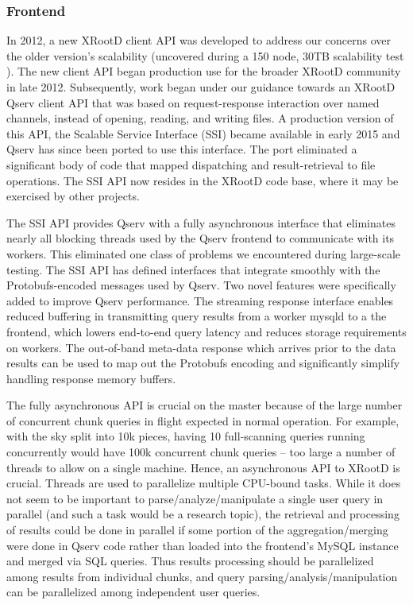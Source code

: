 \documentclass[DM,lsstdraft,toc]{lsstdoc}
\begin{document}
\subsubsection{Frontend}\label{frontend}

In 2012, a new XRootD client API was developed to address our concerns over
the older version's scalability (uncovered during a 150 node, 30TB scalability
test ). The new client API began production use for the
broader XRootD community in late 2012. Subsequently, work began under our
guidance towards an XRootD Qserv client API that was based on request-response
interaction over named channels, instead of opening, reading, and writing
files. A production version of this API, the Scalable Service Interface (SSI)
became available in early 2015 and Qserv has since been ported to use this
interface. The port eliminated a significant body of code that mapped
dispatching and result-retrieval to file operations. The SSI API now resides
in the XRootD code base, where it may be exercised by other projects.

The SSI API provides Qserv with a fully asynchronous interface that eliminates
nearly all blocking threads used by the Qserv frontend to communicate with its
workers. This eliminated one class of problems we encountered during large-scale
testing. The SSI API has defined interfaces that integrate smoothly with
the Protobufs-encoded messages used by Qserv. Two novel features were
specifically added to improve Qserv performance. The streaming response
interface enables reduced buffering in transmitting query results from a
worker mysqld to a the frontend, which lowers end-to-end query latency and
reduces storage requirements on workers. The out-of-band meta-data response
which arrives prior to the data results can be used to map out the Protobufs
encoding and significantly simplify handling response memory buffers.

The fully asynchronous API is crucial on the master because of the large
number of concurrent chunk queries in flight expected in normal operation. For
example, with the sky split into 10k pieces, having 10 full-scanning queries
running concurrently would have 100k concurrent chunk queries -- too large a
number of threads to allow on a single machine. Hence, an asynchronous API to
XRootD is crucial. Threads are used to parallelize multiple CPU-bound tasks.
While it does not seem to be important to parse/analyze/manipulate a single
user query in parallel (and such a task would be a research topic), the
retrieval and processing of results could be done in parallel if some portion
of the aggregation/merging were done in Qserv code rather than loaded into the
frontend's MySQL instance and merged via SQL queries. Thus results processing
should be parallelized among results from individual chunks, and query
parsing/analysis/manipulation can be parallelized among independent user
queries.
\end{document}

